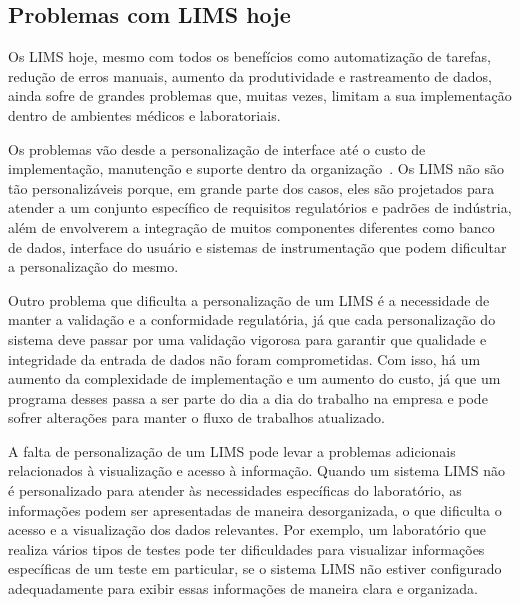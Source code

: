 \subsection{Problemas com LIMS hoje}


Os LIMS hoje, mesmo com todos os benefícios como automatização de tarefas, redução de erros manuais, aumento da produtividade e rastreamento de dados, ainda sofre de grandes problemas que, muitas vezes, limitam a sua implementação dentro de ambientes médicos e laboratoriais.

Os problemas vão desde a personalização de interface até o custo de implementação, manutenção e suporte dentro da organização~\cite{Avery2000ProductGuide., 2018CommonAstrix}.
Os LIMS não são tão personalizáveis porque, em grande parte dos casos, eles são projetados para atender a um conjunto específico de requisitos regulatórios e padrões de indústria, além de envolverem a integração de muitos componentes diferentes como banco de dados, interface do usuário e sistemas de instrumentação que podem dificultar a personalização do mesmo.

Outro problema que dificulta a personalização de um LIMS é a necessidade de manter a validação e a conformidade regulatória, já que cada personalização do sistema deve passar por uma validação vigorosa para garantir que qualidade e integridade da entrada de dados não foram comprometidas.
Com isso, há um aumento da complexidade de implementação e um aumento do custo, já que um programa desses passa a ser parte do dia a dia do trabalho na empresa e pode sofrer alterações para manter o fluxo de trabalhos atualizado.



A falta de personalização de um LIMS pode levar a problemas adicionais relacionados à visualização e acesso à informação. Quando um sistema LIMS não é personalizado para atender às necessidades específicas do laboratório, as informações podem ser apresentadas de maneira desorganizada, o que dificulta o acesso e a visualização dos dados relevantes. Por exemplo, um laboratório que realiza vários tipos de testes pode ter dificuldades para visualizar informações específicas de um teste em particular, se o sistema LIMS não estiver configurado adequadamente para exibir essas informações de maneira clara e organizada.

